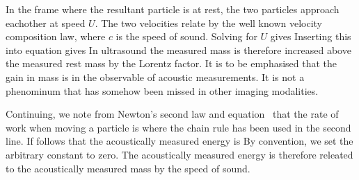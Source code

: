 In the frame where the resultant particle is at rest,
the two particles approach eachother at speed $U$.
The two velocities relate by the well known velocity composition law,
where $c$ is the speed of sound.
Solving for $U$ gives
Inserting this into equation  gives
In ultrasound the measured mass is therefore increased above the measured rest mass
by the Lorentz factor.
It is to be emphasised
that the gain in mass is in the observable of acoustic measurements.
It is not a phenominum that has somehow been missed in other imaging modalities.

Continuing,
we note from Newton's second law and equation~ that the rate of work
when moving a particle is
where the chain rule has been used in the second line.
If follows that the acoustically measured energy is
By convention, we set the arbitrary constant to zero.
The acoustically measured energy is therefore releated to the acoustically measured mass by the speed of sound.










